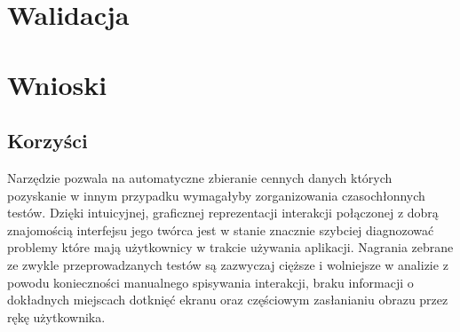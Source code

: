 \section{Walidacja}


\section{Wnioski}

\subsection{Korzyści}
Narzędzie pozwala na automatyczne zbieranie cennych danych których pozyskanie w innym przypadku wymagałyby zorganizowania czasochłonnych testów. Dzięki intuicyjnej, graficznej reprezentacji interakcji połączonej z dobrą znajomością interfejsu jego twórca jest w stanie znacznie szybciej diagnozować problemy które mają użytkownicy w trakcie używania aplikacji. Nagrania zebrane ze zwykle przeprowadzanych testów są zazwyczaj cięższe i wolniejsze w analizie z powodu konieczności manualnego spisywania interakcji, braku informacji o dokładnych miejscach dotknięć ekranu oraz częściowym zasłanianiu obrazu przez rękę użytkownika. 
